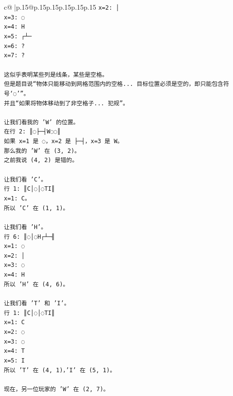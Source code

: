 \documentclass{article}
\begin{document}
{\begin{supertabular}{c@{$\;$}|p{.15\linewidth}@{}p{.15\linewidth}p{.15\linewidth}p{.15\linewidth}p{.15\linewidth}p{.15\linewidth}}
{{{\texttt{x=2: │} \\
\texttt{x=3: ◌} \\
\texttt{x=4: H} \\
\texttt{x=5: ┌┴─} \\
\texttt{x=6: ?} \\
\texttt{x=7: ?} \\
\\ 
\texttt{这似乎表明某些列是线条，某些是空格。} \\
\texttt{但是题目说“物体只能移动到网格范围内的空格... 目标位置必须是空的，即只能包含符号‘◌’”。} \\
\texttt{并且“如果将物体移动到了非空格子... 犯规”。} \\
\\ 
\texttt{让我们看我的 'W' 的位置。} \\
\texttt{在行 2: ║◌├─┤W◌◌║} \\
\texttt{如果 x=1 是 ◌，x=2 是 ├─┤，x=3 是 W。} \\
\texttt{那么我的 'W' 在 (3, 2)。} \\
\texttt{之前我说 (4, 2) 是错的。} \\
\\ 
\texttt{让我们看 'C'。} \\
\texttt{行 1: ║C│◌│◌TI║} \\
\texttt{x=1: C。} \\
\texttt{所以 'C' 在 (1, 1)。} \\
\\ 
\texttt{让我们看 'H'。} \\
\texttt{行 6: ║◌│◌H┌┴─╢} \\
\texttt{x=1: ◌} \\
\texttt{x=2: │} \\
\texttt{x=3: ◌} \\
\texttt{x=4: H} \\
\texttt{所以 'H' 在 (4, 6)。} \\
\\ 
\texttt{让我们看 'T' 和 'I'。} \\
\texttt{行 1: ║C│◌│◌TI║} \\
\texttt{x=1: C} \\
\texttt{x=2: ◌} \\
\texttt{x=3: ◌} \\
\texttt{x=4: T} \\
\texttt{x=5: I} \\
\texttt{所以 'T' 在 (4, 1)，'I' 在 (5, 1)。} \\
\\ 
\texttt{现在，另一位玩家的 'W' 在 (2, 7)。} \\
}}}
\end{supertabular}}
\end{document}
